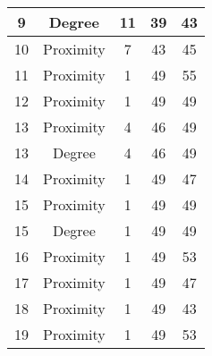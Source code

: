 \documentclass[results.tex]{subfiles}
\begin{document}
\begin{center}
\begin{tabular}{| c || c | c | c | c |}
            \hline
            9                       & Degree                       & 11                     & 39                      & 43                   \\
            \hline
            10                      & Proximity                    & 7                      & 43                      & 45                   \\
            \hline
            11                      & Proximity                    & 1                      & 49                      & 55                   \\
            \hline
            12                      & Proximity                    & 1                      & 49                      & 49                   \\
            \hline
            13                      & Proximity                    & 4                      & 46                      & 49                   \\
            \hline
            13                      & Degree                       & 4                      & 46                      & 49                   \\
            \hline
            14                      & Proximity                    & 1                      & 49                      & 47                   \\
            \hline
            15                      & Proximity                    & 1                      & 49                      & 49                   \\
            \hline
            15                      & Degree                       & 1                      & 49                      & 49                   \\
            \hline
            16                      & Proximity                    & 1                      & 49                      & 53                   \\
            \hline
            17                      & Proximity                    & 1                      & 49                      & 47                   \\
            \hline
            18                      & Proximity                    & 1                      & 49                      & 43                   \\
            \hline
            19                      & Proximity                    & 1                      & 49                      & 53                   \\

\end{tabular}
\end{center}
\end{document}
